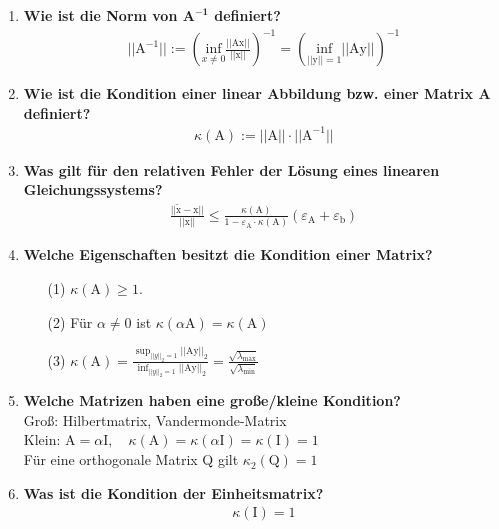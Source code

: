 \begin{enumerate}
		\item \textbf{Wie ist die Norm von \(\mathbf{A^{-1}}\) definiert?} \\
			\begin{align*}
				||\text{A}^{-1}||:=\left(\underset{x\neq0}{\text{inf}}\frac{||\text{Ax}||}{||\text{x}||}\right)^{-1} = \left(\underset{||\text{y}||=1}{\text{inf}}||\text{Ay}||\right)^{-1}
			\end{align*}
		
		\item \textbf{Wie ist die Kondition einer linear Abbildung bzw. einer Matrix A definiert?}
			\begin{align*}
				\kappa(\text{A}):=||\text{A}||\cdot||\text{A}^{-1}||
			\end{align*}
		
		\item \textbf{Was gilt für den relativen Fehler der Lösung eines linearen Gleichungssystems?}
			\begin{align*}
				\frac{||\tilde{\text{x}}-\text{x}||}{||\text{x}||}\leq \frac{\kappa(\text{A})}{1-\varepsilon_\text{A}\cdot\kappa(\text{A})}(\varepsilon_\text{A}+\varepsilon_\text{b})
			\end{align*}
		
		\item \textbf{Welche Eigenschaften besitzt die Kondition einer Matrix?}
			\begin{enumerate}
				\item[(1)] \(\kappa(\text{A})\geq1\).
				\item[(2)] Für \(\alpha\neq0\) ist \(\kappa(\alpha\text{A})=\kappa(\text{A})\)
				\item[(3)] \(\kappa(\text{A})=\frac{\sup_{||y||_2=1}||\text{Ay}||_2}{\inf_{||y||_2=1}||\text{Ay}||_2}=
				\frac{\sqrt{\lambda_{\max}}}{\sqrt{\lambda_{\min}}}\)
			\end{enumerate}
		
		\item \textbf{Welche Matrizen haben eine große/kleine Kondition?} \\
		Groß: Hilbertmatrix, Vandermonde-Matrix \\
		Klein: \(\text{A}=\alpha\text{I}, \quad \kappa(\text{A})=\kappa(\alpha\text{I})=\kappa(\text{I})=1\)\\
		\mbox{}\hspace{0.88cm} Für eine orthogonale Matrix Q gilt \(\kappa_2(\text{Q})=1\)
		
		\item \textbf{Was ist die Kondition der Einheitsmatrix?}
			\begin{align*}
				\kappa(\text{I})=1
			\end{align*}
		

\end{enumerate}
